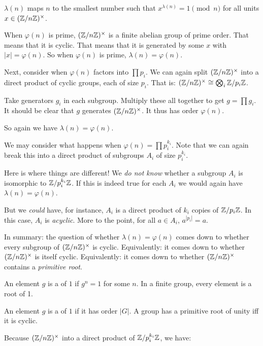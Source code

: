 \begin{definition}
   $\lambda(n)$ maps $n$ to the
  smallest number such that $x^{\lambda(n)} = 1 \pmod{n}$ for all units
  $x \in \mathopen{}\left( {\mathbb{Z} / n\mathbb{Z}} \right)\mathclose{}^\times$.
\end{definition}

\begin{remark}
  When $\varphi(n)$ is prime, $\mathopen{}\left( {\mathbb{Z} / n\mathbb{Z}} \right)\mathclose{}^\times$ is a finite abelian group of
  prime order. That means that it is cyclic. That means that it is
  generated by some $x$ with $|x| = \varphi(n)$. So when $\varphi(n)$ is
  prime, $\lambda(n) = \varphi(n)$.
\end{remark}

\begin{remark}
  Next, consider when $\varphi(n)$ factors into $\prod p_i$. We can
  again split $\mathopen{}\left( {\mathbb{Z} / n\mathbb{Z}} \right)\mathclose{}^\times$ into a direct product of cyclic groups, each of
  size $p_i$. That is: $\mathopen{}\left( {\mathbb{Z} / n\mathbb{Z}} \right)\mathclose{}^\times \cong \bigotimes_i \mathbb{Z} / p_i\mathbb{Z}$.

  Take generators $g_i$ in each subgroup. Multiply these all together to
  get $g = \prod g_i$. It should be clear that $g$ generates $\mathopen{}\left( {\mathbb{Z} / n\mathbb{Z}} \right)\mathclose{}^\times$.
  It thus has order $\varphi(n)$.

  So again we have $\lambda(n) = \varphi(n)$.
\end{remark}

\begin{remark}
  We may consider what happens when $\varphi(n) = \prod p_i^{k_i}$. Note
  that we can again break this into a direct product of subgroups $A_i$
  of size $p_i^{k_i}$.

  Here is where things are different! We \emph{do not know} whether a
  subgroup $A_i$ is isomorphic to $\mathbb{Z} / p_i^{k_i}\mathbb{Z}$. If this is indeed
  true for each $A_i$ we would again have $\lambda(n) = \varphi(n)$.

  But we \emph{could} have, for instance, $A_i$ is a direct product of
  $k_i$ copies of $\mathbb{Z} / p_i\mathbb{Z}$. In this case, $A_i$ is \emph{acyclic}.
  More to the point, for all $a \in A_i$, $a^{|p_i|} = a$.

  In summary: the question of whether $\lambda(n) = \varphi(n)$ comes
  down to whether every subgroup of $\mathopen{}\left( {\mathbb{Z} / n\mathbb{Z}} \right)\mathclose{}^\times$ is cyclic. Equivalently:
  it comes down to whether $\mathopen{}\left( {\mathbb{Z} / n\mathbb{Z}} \right)\mathclose{}^\times$ is itself cyclic. Equivalently: it
  comes down to whether $\mathopen{}\left( {\mathbb{Z} / n\mathbb{Z}} \right)\mathclose{}^\times$ contains a \emph{primitive root}.
\end{remark}

\begin{definition}
  An element $g$ is a  of $1$ if $g^n = 1$ for some $n$. In
  a finite group, every element is a root of 1.

  An element $g$ is a  of $1$ if it has order
  $|G|$. A group has a primitive root of unity iff it is cyclic.
\end{definition}

\begin{proposition}
  Because $\mathopen{}\left( {\mathbb{Z} / n\mathbb{Z}} \right)\mathclose{}^\times$ into a direct product of $\mathbb{Z} / p_i^{k_i}\mathbb{Z}$, we
  have:

  \begin{nedqn}
    \lambda{}
  \eqcol
    \lcm{}
  \end{nedqn}
\end{proposition}

